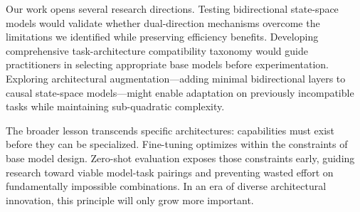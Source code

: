 Our work opens several research directions. Testing bidirectional state-space models would validate whether dual-direction mechanisms overcome the limitations we identified while preserving efficiency benefits. Developing comprehensive task-architecture compatibility taxonomy would guide practitioners in selecting appropriate base models before experimentation. Exploring architectural augmentation---adding minimal bidirectional layers to causal state-space models---might enable adaptation on previously incompatible tasks while maintaining sub-quadratic complexity.

The broader lesson transcends specific architectures: capabilities must exist before they can be specialized. Fine-tuning optimizes within the constraints of base model design. Zero-shot evaluation exposes those constraints early, guiding research toward viable model-task pairings and preventing wasted effort on fundamentally impossible combinations. In an era of diverse architectural innovation, this principle will only grow more important.
